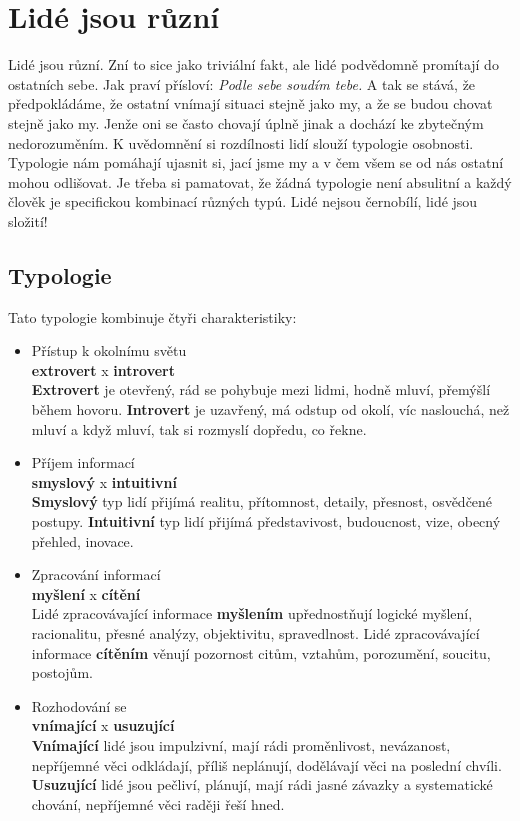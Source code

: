 \documentclass[a4paper,12pt,final]{report}
\begin{document}
\section{Lidé jsou různí}
\pagelogos
Lidé jsou různí. Zní to sice jako triviální fakt, ale lidé podvědomně promítají do ostatních sebe. Jak praví přísloví: \textit{Podle sebe soudím tebe.} A tak se stává, že předpokládáme, že ostatní vnímají situaci stejně jako my, a že se budou chovat stejně jako my.
Jenže oni se často chovají úplně jinak a dochází ke zbytečným nedorozuměním.
K uvědomnění si rozdílnosti lidí slouží typologie osobnosti. Typologie nám pomáhají ujasnit si, jací jsme my a v čem všem se od nás ostatní mohou odlišovat. Je třeba si pamatovat, že žádná typologie není absulitní a každý člověk je specifickou kombinací různých typú. Lidé nejsou černobílí, lidé jsou složití!
\begin{samepage}
\subsection*{Typologie}
Tato typologie kombinuje čtyři charakteristiky:
\begin{itemize}
 \item Přístup k okolnímu světu\\
    \textbf{extrovert} x \textbf{introvert}\\
    \textbf{Extrovert} je otevřený, rád se pohybuje mezi lidmi, hodně mluví, přemýšlí během hovoru. \textbf{Introvert} je uzavřený, má odstup od okolí, víc naslouchá, než mluví a když mluví, tak si rozmyslí dopředu, co řekne.
    
 \item Příjem informací\\
    \textbf{smyslový} x \textbf{intuitivní}\\
    \textbf{Smyslový} typ lidí přijímá realitu, přítomnost, detaily, přesnost, osvědčené postupy. \textbf{Intuitivní} typ lidí přijímá představivost, budoucnost, vize, obecný přehled, inovace.
 \item Zpracování informací\\
    \textbf{myšlení} x \textbf{cítění}\\
    Lidé zpracovávající informace \textbf{myšlením} upřednostňují logické myšlení, racionalitu, přesné analýzy, objektivitu, spravedlnost. Lidé zpracovávající informace \textbf{cítěním} věnují pozornost citům, vztahům, porozumění, soucitu, postojům.
 \item Rozhodování se\\
    \textbf{vnímající} x \textbf{usuzující}\\
    \textbf{Vnímající} lidé jsou impulzivní, mají rádi proměnlivost, nevázanost, nepříjemné věci odkládají, příliš neplánují, dodělávají věci na poslední chvíli. \textbf{Usuzující} lidé jsou pečliví, plánují, mají rádi jasné závazky a systematické chování, nepříjemné věci raději řeší hned.
\end{itemize}
\end{samepage}\pagelogos
\end{document}
